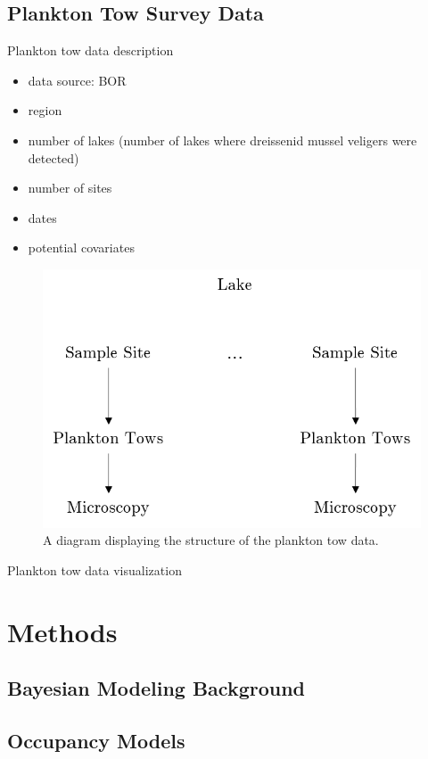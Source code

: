\documentclass[12pt]{article}\usepackage[]{graphicx}\usepackage[]{color}
\begin{document}
\subsection{Plankton Tow Survey Data}

Plankton tow data description
\begin{itemize}
  \item data source: BOR
  \item region
  \item number of lakes (number of lakes where dreissenid mussel veligers were detected)
  \item number of sites
  \item dates
  \item potential covariates
\end{itemize}

\begin{figure}[h]
	\centering
	\includegraphics[scale = 0.7]{planktontow}
	\caption{A diagram displaying the structure of the plankton tow data.}
	\label{pt}
\end{figure}

Plankton tow data visualization

\section{Methods}

\subsection{Bayesian Modeling Background}

\subsection{Occupancy Models}
\end{document}
